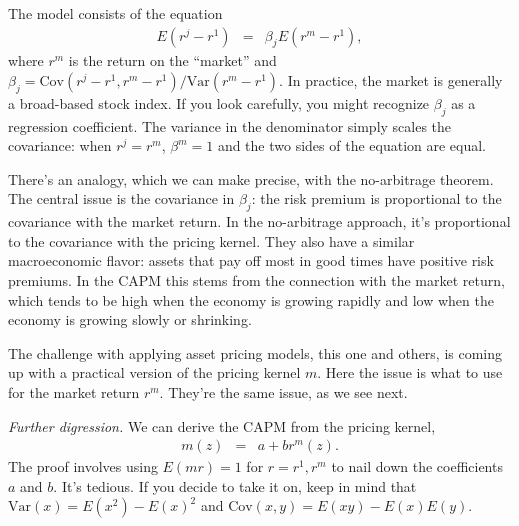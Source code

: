 \documentclass[11pt]{article}
\begin{document}
\begin{comment}
On Sun, Oct 5, 2014 at 2:17 PM, David Backus <dbackus@stern.nyu.edu> wrote:
Does anyone in finance use it these days?

Okun:
Sure.  It is a used in firm valuation applications (M\&A, tax appraisal, private equity investing).  It is also useful in valuation of public equities (implied growth rate).

For connection to E(mr) = 1, see Cochrane Section .
\end{comment}

The model consists of the equation
\begin{eqnarray}
    E (r^j - r^1) &=& \beta_j E (r^m - r^1) ,
    \label{eq:capm}
\end{eqnarray}
where $r^m$ is the return on the ``market'' and
$\beta_j = \mbox{Cov}(r^j - r^1 , r^m - r^1)/ \mbox{Var}(r^m - r^1)$.
In practice, the market is generally a broad-based stock index.
If you look carefully, you might recognize $\beta_j$ as a regression coefficient.
The variance in the denominator simply scales the covariance:
when $r^j = r^m$, $\beta^m = 1$ and the two sides of the equation are equal.

There's an  analogy, which we can make precise, with the no-arbitrage theorem.
The central issue is the covariance in $\beta_j$:
the risk premium is proportional to the covariance with the market return.
In the no-arbitrage approach, it's proportional to the covariance with
the pricing kernel.
They also have a similar macroeconomic flavor:
assets that pay off most in good times have positive risk premiums.
In the CAPM this stems from the connection with the market return,
which tends to be high when
the economy is growing rapidly and low when the economy is growing slowly or shrinking.

The challenge with applying asset pricing models, this one and others,
is coming up with a practical version of the pricing kernel $m$.
Here the issue is what to use for the market return $r^m$.
They're the same issue, as we see next.



{\it Further digression.\/}
We can derive the CAPM from the pricing kernel,
\begin{eqnarray*}
    m(z) &=& a + b r^m(z) .
\end{eqnarray*}
The proof involves using $E(mr)= 1$ for $r = r^1, r^m$ to nail down
the coefficients $a$ and $b$.  It's tedious.
If you decide to take it on, keep in mind that
$ \mbox{Var}(x) = E(x^2) - E(x)^2$
and $ \mbox{Cov}(x, y) = E(xy) - E(x) E(y)$.
\end{document}
